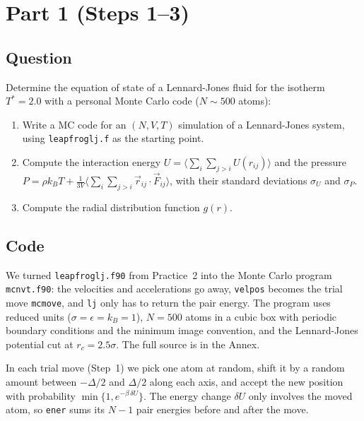 
\section{Part 1 (Steps 1--3)}

\subsection{Question}
Determine the equation of state of a Lennard-Jones fluid for the isotherm $T^*=2.0$ with a personal Monte Carlo code ($N\sim 500$ atoms):
\begin{enumerate}
  \item Write a MC code for an $(N,V,T)$ simulation of a Lennard-Jones system, using \texttt{leapfroglj.f} as the starting point.
  \item Compute the interaction energy $U=\langle\sum_i\sum_{j>i}U(r_{ij})\rangle$ and the pressure $P=\rho k_BT+\frac{1}{3V}\langle\sum_i\sum_{j>i}\vec r_{ij}\cdot\vec F_{ij}\rangle$, with their standard deviations $\sigma_U$ and $\sigma_P$.
  \item Compute the radial distribution function $g(r)$.
\end{enumerate}

\subsection{Code}
We turned \texttt{leapfroglj.f90} from Practice~2 into the Monte Carlo program \texttt{mcnvt.f90}: the velocities and accelerations go away, \texttt{velpos} becomes the trial move \texttt{mcmove}, and \texttt{lj} only has to return the pair energy. The program uses reduced units ($\sigma=\epsilon=k_B=1$), $N=500$ atoms in a cubic box with periodic boundary conditions and the minimum image convention, and the Lennard-Jones potential cut at $r_c=2.5\sigma$. The full source is in the Annex.

In each trial move (Step~1) we pick one atom at random, shift it by a random amount between $-\Delta/2$ and $\Delta/2$ along each axis, and accept the new position with probability $\min\{1,e^{-\beta\,\delta U}\}$. The energy change $\delta U$ only involves the moved atom, so \texttt{ener} sums its $N-1$ pair energies before and after the move.


